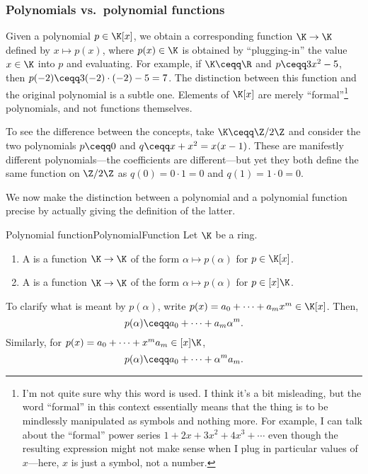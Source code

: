 \subsubsection{Polynomials vs.~polynomial functions}\label{sss1.1.1}

Given a polynomial $p\in \K [x]$, we obtain a corresponding function $\K \rightarrow \K$ defined by $x\mapsto p(x)$, where $p(x)\in \K$ is obtained by ``plugging-in'' the value $x\in \K$ into $p$ and evaluating.  For example, if $\K \ceqq \R$ and $p\ceqq 3x^2-5$, then $p(-2)\ceqq 3(-2)\cdot (-2)-5=7$.  The distinction between this function and the original polynomial is a subtle one.  Elements of $\K [x]$ are merely ``formal''\footnote{I'm not quite sure why this word is used.  I think it's a bit misleading, but the word ``formal'' in this context essentially means that the thing is to be mindlessly manipulated as symbols and nothing more.  For example, I can talk about the ``formal'' power series $1+2x+3x^2+4x^3+\cdots$ even though the resulting expression might not make sense when I plug in particular values of $x$---here, $x$ is just a symbol, not a number.} polynomials, and not functions themselves.

To see the difference between the concepts, take $\K \ceqq \Z /2\Z$ and consider the two polynomials $p\ceqq 0$ and $q\ceqq x+x^2=x(x-1)$.  These are manifestly different polynomials---the coefficients are different---but yet they both define the same function on $\Z /2\Z$ as $q(0)=0\cdot 1=0$ and $q(1)=1\cdot 0=0$.

We now make the distinction between a polynomial and a polynomial function precise by actually giving the definition of the latter.
\begin{dfn}{Polynomial function}{PolynomialFunction}
	Let $\K$ be a ring.
	\begin{enumerate}
		\item A  is a function $\K \rightarrow \K$ of the form $\alpha \mapsto p(\alpha )$ for $p\in \K [x]$.
		\item A  is a function $\K \rightarrow \K$ of the form $\alpha \mapsto p(\alpha )$ for $p\in [x]\K$.
	\end{enumerate}
	\begin{rmk}
		To clarify what is meant by $p(\alpha )$, write $p(x)=a_0+\cdots +a_mx^m\in \K [x]$.  Then,
		\begin{equation}
			p(\alpha )\ceqq a_0+\cdots +a_m\alpha ^m.
		\end{equation}
		Similarly, for $p(x)=a_0+\cdots +x^ma_m\in [x]\K$,
		\begin{equation}
			p(\alpha )\ceqq a_0+\cdots +\alpha ^ma_m.
		\end{equation}
	\end{rmk}
\end{dfn}

